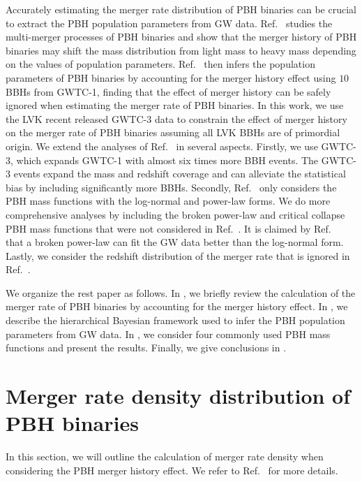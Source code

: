\documentclass[
reprint,           %
superscriptaddress,%
amsmath,           %
amssymb,           %
aps,               %
prd,               %
notitlepage,       %
longbibliography,  %
floatfix,          %
nofootinbib,
]{revtex4-1}
\begin{document}
Accurately estimating the merger rate distribution of PBH binaries can be crucial to extract the PBH population parameters from GW data. Ref.~\cite{Liu:2019rnx} studies the multi-merger processes of PBH binaries and show that the merger history of PBH binaries may shift the mass distribution from light mass to heavy mass depending on the values of population parameters. Ref.~\cite{Wu:2020drm} then infers the population parameters of PBH binaries by accounting for the merger history effect using $10$ BBHs from GWTC-1, finding that the effect of merger history can be safely ignored when estimating the merger rate of PBH binaries. 
In this work, we use the LVK recent released GWTC-3 data to constrain the effect of merger history on the merger rate of PBH binaries assuming all LVK BBHs are of primordial origin.
We extend the analyses of Ref.~\cite{Wu:2020drm} in several aspects. Firstly, we use GWTC-3, which expands GWTC-1 with almost six times more BBH events. The GWTC-3 events expand the mass and redshift coverage and can alleviate the statistical bias by including significantly more BBHs. Secondly, Ref.~\cite{Wu:2020drm} only considers the PBH mass functions with the log-normal and power-law forms. We do more comprehensive analyses by including the broken power-law and critical collapse PBH mass functions that were not considered in Ref.~\cite{Wu:2020drm}. It is claimed by Ref.~\cite{Deng:2021ezy} that a broken power-law can fit the GW data better than the log-normal form. Lastly, we consider the redshift distribution of the merger rate that is ignored in Ref.~\cite{Wu:2020drm}.

We organize the rest paper as follows.
In , we briefly review the calculation of the merger rate of PBH binaries by accounting for the merger history effect.
In , we describe the hierarchical Bayesian framework used to infer the PBH population parameters from GW data.
In , we consider four commonly used PBH mass functions and present the results.
Finally, we give conclusions in .

\section{\label{merger}Merger rate density distribution of PBH binaries}

In this section, we will outline the calculation of merger rate density when considering the PBH merger history effect. We refer to Ref.~\cite{Liu:2019rnx} for more details.
\end{document}
